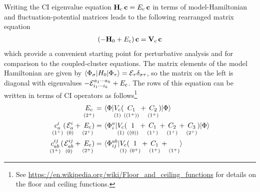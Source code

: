 \documentclass[11pt]{article}
\numberwithin{equation}{section}
\begin{document}
\begin{rmk}
\label{rmk:ci-perturbative-analysis}
Writing the CI eigenvalue equation $\mathbf{H}_{\mathrm{c}}\,\mathbf{c}=E_{\mathrm{c}}\,\mathbf{c}$ in terms of model-Hamiltonian and fluctuation-potential matrices leads to the following rearranged matrix equation
\begin{align}
\label{eq:ci-matrix-equation}
  (
  -
    \mathbf{H}_0
  +
    E_{\mathrm{c}}
  )\,
  \mathbf{c}
=
  \mathbf{V}_{\mathrm{c}}\,
  \mathbf{c}
\end{align}
which provide a convenient starting point for perturbative analysis and for comparison to the coupled-cluster equations.
The matrix elements of the model Hamiltonian are given by
$
  \langle\Phi _{\sigma }|H_0|\Phi _{\tau }\rangle
=
  \mathcal{E}_{\tau }
  \delta _{\sigma \tau }
$,
so the matrix on the left is diagonal with eigenvalues
$
-
  \mathcal{E}_{i_1\cdots i_k}^{a_1\cdots a_k}
+
  E_{\mathrm{c}}
$.
The rows of this equation can be written in terms of CI operators as follows\footnote{See \url{https://en.wikipedia.org/wiki/Floor_and_ceiling_functions} for details on the floor and ceiling functions.}
\begin{align}
\label{eq:ci-reference-equation}
  \underset{(2^+)}{\vphantom{(}
    E_{\mathrm{c}}
  }
=&\
  \langle\Phi |
  \underset{(1)}{\vphantom{(}
    V_{\mathrm{c}}
  }
    (
    \underset{((1^+))}{\vphantom{(}
      C_1
    }
    +
    \underset{(1^+)}{\vphantom{(}
      C_2
    }
    )
  |\Phi \rangle
\\
\label{eq:ci-singles-equation}
  \underset{(1^+)}{\vphantom{(}
  c_a^i
  }
  (\hspace{1pt}
  \underset{(0)}{\vphantom{(}
    \mathcal{E}_a^i
  }
  +
  \underset{(2^+)}{\vphantom{(}
    E_{\mathrm{c}}
  }
  \hspace{-2pt}
  )
=&\
  \langle\Phi _i^a|
  \underset{(1)}{\vphantom{(}
    V_{\mathrm{c}}
  }
    (
    \underset{((0))}{\vphantom{(}
      1
    }
    +
    \underset{(1^+)}{\vphantom{(}
      C_1
    }
    +
    \underset{(1^+)}{\vphantom{(}
      C_2
    }
    +
    \underset{(2^+)}{\vphantom{(}
      C_3
    }
    )
  |\Phi \rangle
\\
\label{eq:ci-doubles-equation}
  \underset{(1^+)}{\vphantom{(}
  c_{ab}^{ij}
  }
  (\hspace{1pt}
  \underset{(0)}{\vphantom{(}
    \mathcal{E}_{ab}^{ij}
  }
  +
  \underset{(2^+)}{\vphantom{(}
    E_{\mathrm{c}}
  }
  \hspace{-2pt}
  )
=&\
  \langle\Phi _{ij}^{ab}|
  \underset{(1)}{\vphantom{(}
    V_{\mathrm{c}}
  }
    (
    \underset{(0^+)}{\vphantom{(}
      1
    }
    +
    \underset{(1^+)}{\vphantom{(}
      C_1
    }
    +
    \underset{(1^+)}{\vphantom{(}
}\rangle
\end{align}
\end{rmk}
\end{document}

